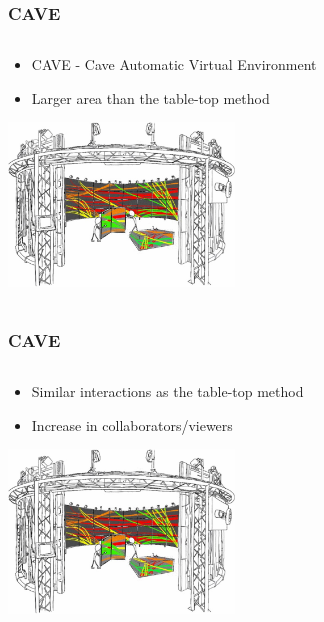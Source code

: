 \documentclass{beamer}
\begin{document}
\begin{frame}
\frametitle{CAVE}
	\begin{columns}
    \begin{column}{0.7\textwidth}
    \begin{itemize}
		\item CAVE - Cave Automatic Virtual Environment 
		\item Larger area than the table-top method
	\end{itemize}
	\begin{center}
	\includegraphics[width=6cm]{../Sample_paper/images/CAVE}
		
	\cite{3D}
	\end{center}
	\end{column}
    \end{columns}
\end{frame}

\begin{frame}
\frametitle{CAVE}
\begin{columns}
    \begin{column}{0.7\textwidth}
    \begin{itemize}
		\item Similar interactions as the table-top method
		\item Increase in collaborators/viewers
	\end{itemize}
		\begin{center}
	\includegraphics[width=6cm]{../Sample_paper/images/CAVE}
		
	\cite{3D}
	\end{center}
	\end{column}
    \end{columns}
\end{frame}
\end{document}
